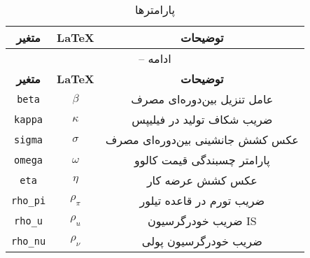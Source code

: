 \begin{center}
\begin{longtable}{ccc}
\caption{پارامترها}\\%
\hline%
\multicolumn{1}{c}{\textbf{متغیر}} &
\multicolumn{1}{c}{\textbf{\LaTeX}} &
\multicolumn{1}{c}{\textbf{توضیحات}}\\%
\hline\hline%
\endfirsthead
\multicolumn{3}{c}{{\tablename} \thetable{} -- ادامه}\\%
\hline%
\multicolumn{1}{c}{\textbf{متغیر}} &
\multicolumn{1}{c}{\textbf{\LaTeX}} &
\multicolumn{1}{c}{\textbf{توضیحات}}\\%
\hline\hline%
\endhead
\texttt{beta} & $\beta$ & عامل تنزیل بین‌دوره‌ای مصرف\\
\texttt{kappa} & $\kappa$ & ضریب شکاف تولید در فیلیپس\\
\texttt{sigma} & $\sigma$ & عکس کشش جانشینی بین‌دوره‌ای مصرف\\
\texttt{omega} & $\omega$ & پارامتر چسبندگی قیمت کالوو\\
\texttt{eta} & $\eta$ & عکس کشش عرضه کار\\
\texttt{rho\_pi} & $\rho_{\pi}$ & ضریب تورم در قاعده تیلور\\
\texttt{rho\_u} & $\rho_u$ & ضریب خودرگرسیون IS\\
\texttt{rho\_nu} & $\rho_{\nu}$ & ضریب خودرگرسیون پولی\\
\hline%
\end{longtable}
\end{center}
